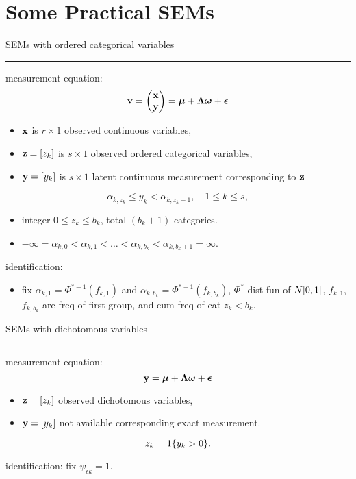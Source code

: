 \newpage

\section*{Some Practical SEMs}

SEMs with ordered categorical variables \hrule

measurement equation: \vspace{-1ex}\[
    \mathbf{v} = \begin{pmatrix} \mathbf{x} \\ \mathbf{y} \end{pmatrix} = \boldsymbol{\mu} + \boldsymbol{\Lambda} \boldsymbol{\omega} + \boldsymbol{\epsilon}
\] \begin{itemize}
    \item $\mathbf{x}$ is $r \times 1$ observed continuous variables,
    \item $\mathbf{z} = [z_k]$ is $s \times 1$ observed ordered categorical variables,
    \item $\mathbf{y} = [y_k]$ is $s \times 1$ latent continuous measurement corresponding to $\mathbf{z}$
\end{itemize}
\[
    \alpha_{k, z_k} \leq y_k < \alpha_{k, z_k + 1}, \quad 1 \leq k \leq s,
\]\begin{itemize}
    \item integer $0 \leq z_k \leq b_k$, total $(b_k + 1)$ categories.
    \item $-\infty = \alpha_{k, 0} < \alpha_{k ,1} < \dots < \alpha_{k, b_k} < \alpha_{k, b_k+1} = \infty$.
\end{itemize}

identification: \begin{itemize}
    \item fix $\alpha_{k, 1} = \Phi^{* -\!1}(f_{k, 1})$ and $\alpha_{k, b_k} = \Phi^{* -\!1}(f_{k, b_k})$, $\Phi^{*}$ dist-fun of ${N}[0, 1]$, $f_{k, 1}$, $f_{k, b_k}$ are freq of first group, and cum-freq of cat $z_k < b_k$.
\end{itemize}

SEMs with dichotomous variables \phantom{g} \hrule

measurement equation:
\[
    \mathbf{y} = \boldsymbol{\mu} + \boldsymbol{\Lambda} \boldsymbol{\omega} + \boldsymbol{\epsilon}
\]
\begin{itemize}
    \item $\mathbf{z} = [z_k]$ observed dichotomous variables,
    \item $\mathbf{y} = [y_k]$ not available corresponding exact measurement.
\end{itemize}
\[
    z_k = 1\{y_k > 0\}.
\]

identification: fix $\psi_{\epsilon k} = 1$.

